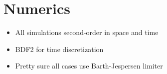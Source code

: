 \section{Numerics}

\begin{itemize}
	\item All simulations second-order in space and time
	\item BDF2 for time discretization
	\item Pretty sure all cases use Barth-Jespersen limiter
\end{itemize}